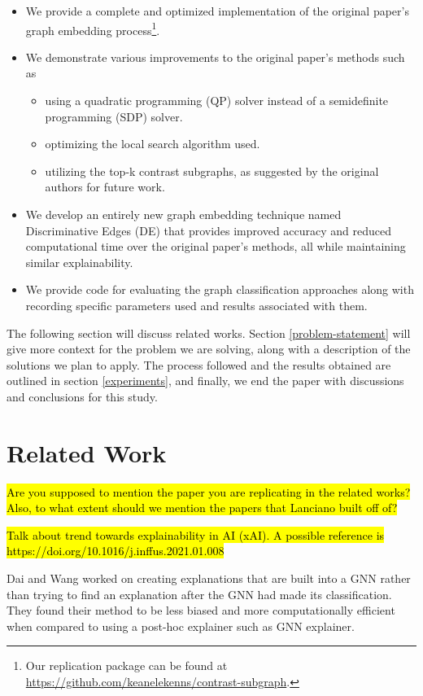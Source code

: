 \documentclass[sigconf]{acmart}
\begin{document}
\begin{itemize}
    \item We provide a complete and optimized implementation of the original paper's graph embedding process\footnote{Our replication package can be found at \url{https://github.com/keanelekenns/contrast-subgraph}.}.
    \item We demonstrate various improvements to the original paper's methods such as 
    \begin{itemize}
        \item using a quadratic programming (QP) solver instead of a semidefinite programming (SDP) solver.
        \item optimizing the local search algorithm used.
        \item utilizing the top-k contrast subgraphs, as suggested by the original authors for future work.
    \end{itemize}
    \item We develop an entirely new graph embedding technique named Discriminative Edges (DE) that provides improved accuracy and reduced computational time over the original paper's methods, all while maintaining similar explainability.
    \item We provide code for evaluating the graph classification approaches along with recording specific parameters used and results associated with them.
\end{itemize}

The following section will discuss related works.
Section \ref{problem-statement} will give more context for the problem we are solving, along with a description of the solutions we plan to apply.
The process followed and the results obtained are outlined in section \ref{experiments}, and finally, we end the paper with discussions and conclusions for this study.

\section{Related Work} \label{related-work}

\hl{Are you supposed to mention the paper you are replicating in the related works? Also, to what extent should we mention the papers that Lanciano built off of?}

\hl{Talk about trend towards explainability in AI (xAI). A possible reference is https://doi.org/10.1016/j.inffus.2021.01.008}

Dai and Wang worked on creating explanations that are built into a GNN \cite{dai2021} rather than trying to find an explanation after the GNN had made its classification.
They found their method to be less biased and more computationally efficient when compared to using a post-hoc explainer such as GNN explainer.
\end{document}
